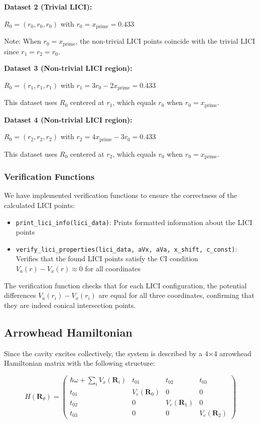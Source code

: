 \documentclass{article}
\begin{document}
\textbf{Dataset 2 (Trivial LICI):}

$R_0 = (r_0, r_0, r_0)$ with $r_0 = x_{\text{prime}} = 0.433$

Note: When $r_0 = x_{\text{prime}}$, the non-trivial LICI points coincide with the trivial LICI since $r_1 = r_2 = r_0$.


\textbf{Dataset 3 (Non-trivial LICI region):}

$R_0 = (r_1, r_1, r_1)$ with $r_1 = 3r_0 - 2x_{\text{prime}} = 0.433$

This dataset uses $R_0$ centered at $r_1$, which equals $r_0$ when $r_0 = x_{\text{prime}}$.


\textbf{Dataset 4 (Non-trivial LICI region):}

$R_0 = (r_2, r_2, r_2)$ with $r_2 = 4x_{\text{prime}} - 3r_0 = 0.433$

This dataset uses $R_0$ centered at $r_2$, which equals $r_0$ when $r_0 = x_{\text{prime}}$.


\subsubsection{Verification Functions}

We have implemented verification functions to ensure the correctness of the calculated LICI points:

\begin{itemize}
    \item \texttt{print\_lici\_info(lici\_data)}: Prints formatted information about the LICI points
    \item \texttt{verify\_lici\_properties(lici\_data, aVx, aVa, x\_shift, c\_const)}: Verifies that the found LICI points satisfy the CI condition $V_a(r) - V_x(r) \approx 0$ for all coordinates
\end{itemize}

The verification function checks that for each LICI configuration, the potential differences $V_a(r_i) - V_x(r_i)$ are equal for all three coordinates, confirming that they are indeed conical intersection points.

\subsection{Arrowhead Hamiltonian}

Since the cavity excites collectively, the system is described by a 4×4 arrowhead Hamiltonian matrix with the following structure:

\begin{equation}
H(\bm{R}_{\theta}) = 
\begin{pmatrix}
\hbar\omega + \sum_i V_x(\bm{R}_i) & t_{01} & t_{02} & t_{03} \\
t_{01} & V_e(\bm{R}_0) & 0 & 0 \\
t_{02} & 0 & V_e(\bm{R}_1) & 0 \\
t_{03} & 0 & 0 & V_e(\bm{R}_2)
\end{pmatrix}
\end{equation}
\end{document}
